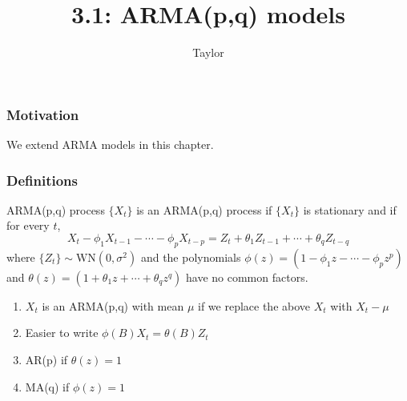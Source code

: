 \documentclass{beamer}
\title["3.1"]{3.1: ARMA(p,q) models}
\author{Taylor}
\institute[UVA] 
{
University of Virginia \\
\medskip
\textit{} 
}
\date{}
\begin{document}

\begin{frame}
\titlepage 
\end{frame}

\begin{frame}
\frametitle{Motivation}

We extend ARMA models in this chapter.

\end{frame}


\begin{frame}
\frametitle{Definitions}

\begin{block}{ARMA(p,q) process}
$\{X_t\}$ is an ARMA(p,q) process if $\{X_t\}$ is stationary and if for every $t$,
\[
X_t - \phi_1 X_{t-1} - \cdots - \phi_p X_{t-p} = Z_t + \theta_1 Z_{t-1} + \cdots + \theta_q Z_{t-q}
\]
where $\{Z_t\} \sim \text{WN}(0,\sigma^2)$ and the polynomials $\phi(z) = (1 - \phi_1 z - \cdots - \phi_p z^p)$ and $\theta(z) = (1 + \theta_1 z  + \cdots + \theta_qz^q)$ have no common factors.
\end{block}

\begin{enumerate}
\item $X_t$ is an ARMA(p,q) with mean $\mu$ if we replace the above $X_t$ with $X_t - \mu$
\item Easier to write $\phi(B)X_t = \theta(B)Z_t$ 
\item AR(p) if $\theta(z) = 1$
\item MA(q) if $\phi(z) = 1$
\end{enumerate}

\end{frame}


\end{document}
